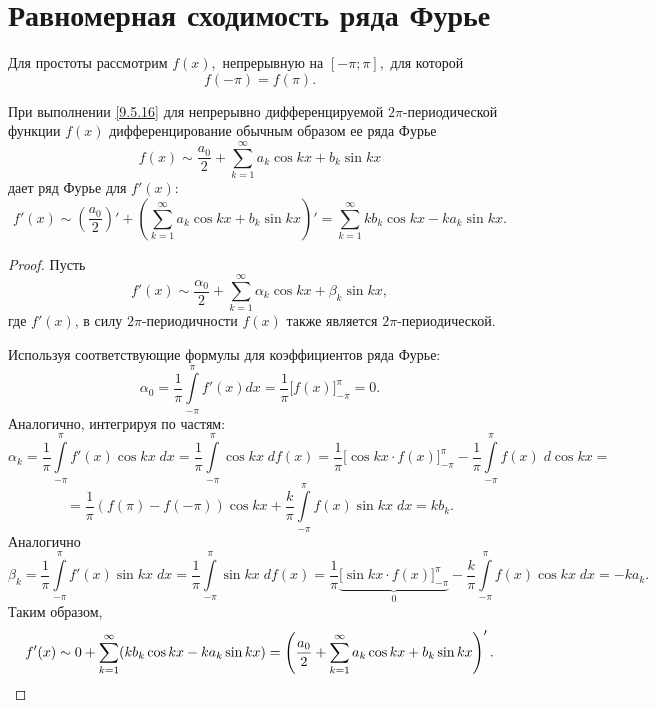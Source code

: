 \documentclass[../../main.tex]{subfiles}
\begin{document}
\section{Равномерная сходимость ряда Фурье}
	Для простоты рассмотрим $f(x),$ непрерывную на $[-\pi; \pi],$ для которой 
	\begin{equation}\label{9.5.16}
	f(-\pi) = f(\pi).
	\end{equation}
	\begin{thm}
		При выполнении \eqref{9.5.16} для непрерывно дифференцируемой 
		$2\pi$-периодической функции $f(x)$ дифференцирование обычным образом ее ряда 
		Фурье
		\[
		f(x) \sim \frac{a_0}{2} + \sum_{k=1}^{\infty}  a_k \cos k x +
		b_k \sin k x
		\]
		дает ряд Фурье для $f'(x):$
		\begin{equation} \label{9.5.17}
			f'(x) \sim \left(\frac{a_0}{2}\right)' + \left(\sum_{k=1}^{\infty}  a_k 
			\cos k x +
			b_k \sin k x\right)' = \sum_{k=1}^{\infty} k b_k \cos k x - k
			a_k \sin k x.
		\end{equation}
	\end{thm}
	\begin{proof}
		Пусть
		\[
			f'(x) \sim \frac{\alpha_0}{2} + \sum_{k=1}^{\infty}  \alpha_k \cos k x +
			\beta_k \sin k x,
		\]
		где $f'(x)$, в силу $2\pi$-периодичности $f(x)$ также является 
		$2\pi$-периодической.
		
		Используя соответствующие формулы для коэффициентов ряда Фурье:
		\[
			\alpha_0 = \frac{1}{\pi} \int\limits_{-\pi}^{\pi} f'(x) dx = \frac{1}{\pi} 
			\big[f(x)\big]_{-\pi}^{\pi} = 0.
		\]
		Аналогично, интегрируя по частям:
		\[
			\alpha_k = \frac{1}{\pi} \int\limits_{-\pi}^{\pi} f'(x) \cos kx\; dx = 
			\frac{1}{\pi} 
			\int\limits_{-\pi}^{\pi} \cos kx\; df(x)  = \frac{1}{\pi} \big[\cos kx
			\cdot f(x)\big]_{-\pi}^{\pi} -
			\frac{1}{\pi} \int\limits_{-\pi}^{\pi} f(x)\;d \cos kx = 
			\]
			\[ =
			\frac{1}{\pi} (f(\pi) - f(-\pi)) \cos kx +
			\frac{k}{\pi} \int\limits_{-\pi}^{\pi} f(x)\sin kx\;dx = k b_k.
		\]
		Аналогично
		\[
			\beta_k = \frac{1}{\pi} \int\limits_{-\pi}^{\pi} f'(x) \sin kx\;dx
			= \frac{1}{\pi} \int\limits_{-\pi}^{\pi} \sin kx\;df(x)  =
			\frac{1}{\pi} \underbrace{\big[\sin kx \cdot f(x)\big]_{-\pi}^{\pi}}_{0} -
			\frac{k}{\pi} \int\limits_{-\pi}^{\pi} f(x) \cos kx\;dx = -ka_k.
		\]
		Таким образом, 
		\[
		f'(x) \sim 0 + \sum_{k=1}^{\infty}( k b_k \cos k x - k
		a_k \sin k x) = \left(\frac{a_0}{2} + \sum_{k=1}^{\infty}  a_k \cos k x +
		b_k \sin k x\right)'.
		\qedhere
		\]
	\end{proof}
\end{document}
